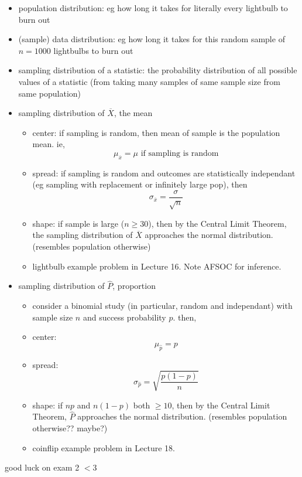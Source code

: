 \documentclass[11pt]{article}
\begin{document}
\begin{itemize}
  \item population distribution: eg how long it takes for literally every lightbulb to burn out
  \item (sample) data distribution: eg how long it takes for this random sample of  $n=1000$ lightbulbs to burn out
  \item sampling distribution of a statistic: the probability distribution of all possible values of a statistic (from taking many samples of same sample size from same population)
  \item sampling distribution of $\overline{X}$, the mean
  \begin{itemize}
    \item center: if sampling is random, then mean of sample is the population mean. ie,
    \[ \mu_{\overline{x}} = \mu \text{ if sampling is random}\]
    \item spread: if sampling is random and outcomes are statistically independant (eg sampling with replacement or infinitely large pop), then 
    \[ \sigma_{\overline{x}}=\frac{\sigma}{\sqrt{n}} \]
    \item shape: if sample is large ($n\ge 30$), then by the Central Limit Theorem, the sampling distribution of $\overline{X}$ approaches the normal distribution. (resembles population otherwise)
    \item lightbulb example problem in Lecture 16. Note AFSOC for inference.
  \end{itemize}
  \item sampling distribution of $\hat{P}$, proportion
  \begin{itemize}
    \item consider a binomial study (in particular, random and independant) with sample size $n$ and success probability $p$. then,
    \item center: 
    \[ \mu_{\hat{p}} = p \]
    \item spread: 
    \[ \sigma_{\hat{p}} = \sqrt{\frac{p(1-p)}{n}} \]
    \item shape: if $np$ and $n(1-p)$ both $\ge 10$, then by the Central Limit Theorem, $\hat{P}$ approaches the normal distribution. (resembles population otherwise?? maybe?)
    \item coinflip example problem in Lecture 18.
  \end{itemize}
\end{itemize}
good luck on exam 2 $<$3
\end{document}
